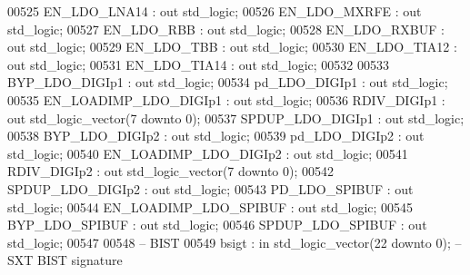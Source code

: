 \begin{DoxyCode}
00525         EN\_LDO\_LNA14    : \textcolor{keywordflow}{out} \textcolor{comment}{std\_logic};
00526         EN\_LDO\_MXRFE    : \textcolor{keywordflow}{out} \textcolor{comment}{std\_logic};
00527         EN\_LDO\_RBB      : \textcolor{keywordflow}{out} \textcolor{comment}{std\_logic};
00528         EN\_LDO\_RXBUF    : \textcolor{keywordflow}{out} \textcolor{comment}{std\_logic};
00529         EN\_LDO\_TBB      : \textcolor{keywordflow}{out} \textcolor{comment}{std\_logic};
00530         EN\_LDO\_TIA12    : \textcolor{keywordflow}{out} \textcolor{comment}{std\_logic};
00531         EN\_LDO\_TIA14    : \textcolor{keywordflow}{out} \textcolor{comment}{std\_logic};
00532         
00533         BYP\_LDO\_DIGIp1              :   \textcolor{keywordflow}{out} \textcolor{comment}{std\_logic};
00534         pd\_LDO\_DIGIp1                   :   \textcolor{keywordflow}{out} \textcolor{comment}{std\_logic};
00535         EN\_LOADIMP\_LDO\_DIGIp1   :   \textcolor{keywordflow}{out} \textcolor{comment}{std\_logic};
00536         RDIV\_DIGIp1                     :   \textcolor{keywordflow}{out} \textcolor{comment}{std\_logic\_vector}(\textcolor{vhdllogic}{}\textcolor{vhdllogic}{7} \textcolor{keywordflow}{downto} \textcolor{vhdllogic}{}\textcolor{vhdllogic}{0});
00537         SPDUP\_LDO\_DIGIp1            :   \textcolor{keywordflow}{out} \textcolor{comment}{std\_logic};
00538         BYP\_LDO\_DIGIp2              :   \textcolor{keywordflow}{out} \textcolor{comment}{std\_logic};
00539         pd\_LDO\_DIGIp2                   :   \textcolor{keywordflow}{out} \textcolor{comment}{std\_logic};
00540         EN\_LOADIMP\_LDO\_DIGIp2   :   \textcolor{keywordflow}{out} \textcolor{comment}{std\_logic};
00541         RDIV\_DIGIp2                     :   \textcolor{keywordflow}{out} \textcolor{comment}{std\_logic\_vector}(\textcolor{vhdllogic}{}\textcolor{vhdllogic}{7} \textcolor{keywordflow}{downto} \textcolor{vhdllogic}{}\textcolor{vhdllogic}{0});
00542         SPDUP\_LDO\_DIGIp2            :   \textcolor{keywordflow}{out} \textcolor{comment}{std\_logic};
00543         PD\_LDO\_SPIBUF : \textcolor{keywordflow}{out} \textcolor{comment}{std\_logic};
00544         EN\_LOADIMP\_LDO\_SPIBUF : \textcolor{keywordflow}{out} \textcolor{comment}{std\_logic};
00545         BYP\_LDO\_SPIBUF  :   \textcolor{keywordflow}{out} \textcolor{comment}{std\_logic};
00546         SPDUP\_LDO\_SPIBUF  : \textcolor{keywordflow}{out} \textcolor{comment}{std\_logic};
00547         
00548 \textcolor{keyword}{        -- BIST}
00549         bsigt       : \textcolor{keywordflow}{in} \textcolor{comment}{std\_logic\_vector}(\textcolor{vhdllogic}{}\textcolor{vhdllogic}{22} \textcolor{keywordflow}{downto} \textcolor{vhdllogic}{}\textcolor{vhdllogic}{0}); \textcolor{keyword}{-- SXT BIST signature}

\end{DoxyCode}
